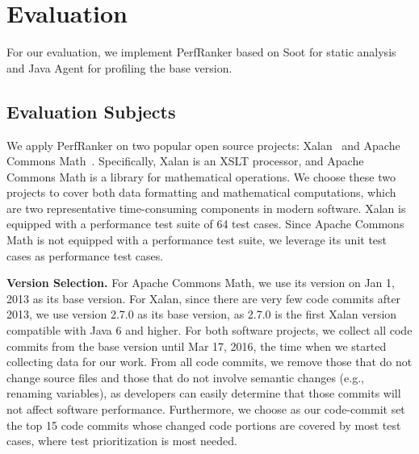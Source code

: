 
\section{Evaluation}
\label{sec:evaluation}

For our evaluation, we implement PerfRanker based on Soot for static analysis and Java Agent for profiling the base version. 

\subsection{Evaluation Subjects}
\label{subsec:subjects}

We apply PerfRanker on two popular open source projects: Xalan~\cite{xalan} and Apache Commons Math~\cite{commonMath}. Specifically, Xalan is an XSLT processor, and Apache Commons Math is a library for mathematical operations. We choose these two projects to cover both data formatting and mathematical computations, which are two representative time-consuming components in modern software. Xalan is equipped with a performance test suite of 64 test cases. Since Apache Commons Math is not equipped with a performance test suite, we leverage its unit test cases as performance test cases. 

\textbf{Version Selection.} For Apache Commons Math, we use its version on Jan 1, 2013 as its base version. For Xalan, since there are very few code commits after 2013, we use version 2.7.0 as its base version, as 2.7.0 is the first Xalan version compatible with Java 6 and higher. For both software projects, we collect all code commits from the base version until Mar 17, 2016, the time when we started collecting data for our work.  From all code commits, we remove those that do not change source files and those that do not involve semantic changes (e.g., renaming variables), as developers can easily determine that those commits will not affect software performance. Furthermore, we choose as our code-commit set the top 15 code commits whose changed code portions are covered by most test cases, where test prioritization is most needed. 


